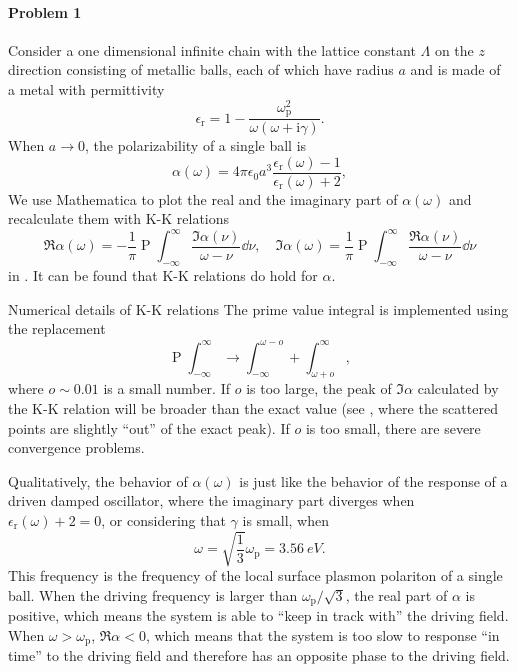 \documentclass[hyperref, a4paper]{article}
\DeclareMathOperator{\primevalue}{P}
\newcommand*{\ii}{\mathrm{i}}
\begin{document}
\paragraph{Problem 1} Consider a one dimensional infinite chain with the lattice constant $\Lambda$ on the $z$ direction consisting of metallic balls, 
each of which have radius $a$ and is made of a metal with permittivity
\begin{equation}
    \epsilon_\text{r} = 1 - \frac{\omega_\text{p}^2}{\omega (\omega + \ii \gamma)}.
\end{equation} 
When $a \to 0$, the polarizability of a single ball is 
\begin{equation}
    \alpha(\omega) = 4 \pi \epsilon_0 a^3 \frac{\epsilon_\text{r}(\omega) - 1}{\epsilon_\text{r}(\omega) + 2},
\end{equation}
We use Mathematica to plot the real and the imaginary part of $\alpha(\omega)$ and recalculate them with 
K-K relations 
\begin{equation}
    \Re \alpha(\omega) = - \frac{1}{\pi} \primevalue \int_{-\infty}^\infty \frac{\Im \alpha(\nu)}{\omega - \nu} \dd{\nu}, \quad \Im \alpha(\omega) = \frac{1}{\pi} \primevalue \int_{-\infty}^\infty \frac{\Re \alpha(\nu)}{\omega - \nu} \dd{\nu}
    \label{eq:kk-relation}
\end{equation}
in . It can be found that K-K relations do hold for $\alpha$. 

\begin{note*}{Numerical details of K-K relations}
    The prime value integral is implemented using the replacement 
    \[
        \primevalue \int_{-\infty}^\infty \longrightarrow \int_{-\infty}^{\omega - o} + \int_{\omega+o}^\infty,
    \]
    where $o \sim 0.01$ is a small number. If $o$ is too large, the peak of $\Im \alpha$ calculated by the 
    K-K relation will be broader than the exact value (see , where the scattered points 
    are slightly ``out'' of the exact peak). If $o$ is too small, there are severe convergence problems.
\end{note*}

Qualitatively, the behavior 
of $\alpha(\omega)$ is just like the behavior of the response of a driven damped oscillator, where the imaginary 
part diverges when $\epsilon_\text{r}(\omega) + 2 = 0$, or considering that $\gamma$ is small, when 
\begin{equation}
    \omega = \sqrt{\frac{1}{3}} \omega_\text{p} = \SI{3.56}{eV}.
\end{equation}
This frequency is the frequency of the local surface plasmon polariton of a single ball.
When the driving frequency is larger than $\omega_\text{p} / \sqrt{3}$, the real part of $\alpha$ is positive, 
which means the system is able to ``keep in track with'' the driving field. When $\omega > \omega_\text{p}$,
$\Re \alpha < 0$, which means that the system is too slow to response ``in time'' to the driving field and 
therefore has an opposite phase to the driving field.
\end{document}
